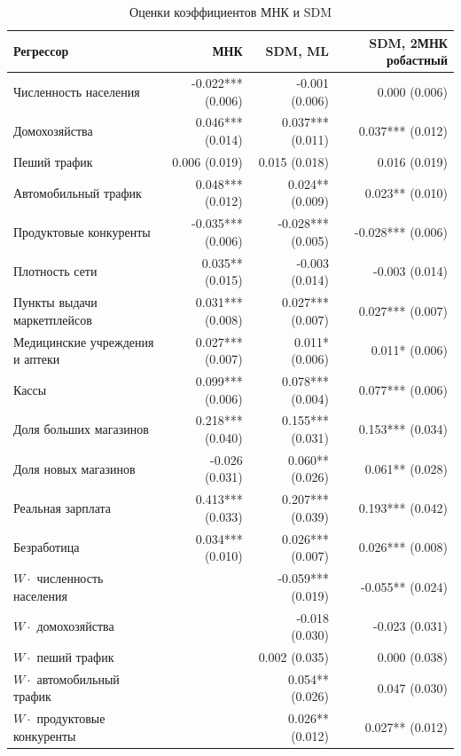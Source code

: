 \documentclass[12pt, a4paper]{article}
\begin{document}
\begin{table}[H]
    \centering
    \footnotesize
    \caption{Оценки коэффициентов МНК и SDM}
    \label{tab:sdm}
    \begin{tabular}{lrrr}
        \toprule
        \textbf{Регрессор} & \textbf{МНК} & \textbf{SDM, ML} & \textbf{SDM, 2МНК робастный} \\
        \midrule
        Численность населения & -0.022*** (0.006) & -0.001 (0.006) & 0.000 (0.006) \\
        Домохозяйства & 0.046*** (0.014) & 0.037*** (0.011) & 0.037*** (0.012) \\
        Пеший трафик & 0.006 (0.019) & 0.015 (0.018) & 0.016 (0.019) \\
        Автомобильный трафик & 0.048*** (0.012) & 0.024** (0.009) & 0.023** (0.010) \\
        Продуктовые конкуренты & -0.035*** (0.006) & -0.028*** (0.005) & -0.028*** (0.006) \\
        Плотность сети & 0.035** (0.015) & -0.003 (0.014) & -0.003 (0.014) \\
        Пункты выдачи маркетплейсов & 0.031*** (0.008) & 0.027*** (0.007) & 0.027*** (0.007) \\
        Медицинские учреждения и аптеки & 0.027*** (0.007) & 0.011* (0.006) & 0.011* (0.006) \\
        Кассы & 0.099*** (0.006) & 0.078*** (0.004) & 0.077*** (0.006) \\
        Доля больших магазинов & 0.218*** (0.040) & 0.155*** (0.031) & 0.153*** (0.034) \\
        Доля новых магазинов & -0.026 (0.031) & 0.060** (0.026) & 0.061** (0.028) \\
        Реальная зарплата & 0.413*** (0.033) & 0.207*** (0.039) & 0.193*** (0.042) \\
        Безработица & 0.034*** (0.010) & 0.026*** (0.007) & 0.026*** (0.008) \\
        $W \cdot$ численность населения &  & -0.059*** (0.019) & -0.055** (0.024) \\
        $W \cdot$ домохозяйства &  & -0.018 (0.030) & -0.023 (0.031) \\
        $W \cdot$ пеший трафик &  & 0.002 (0.035) & 0.000 (0.038) \\
        $W \cdot$ автомобильный трафик &  & 0.054** (0.026) & 0.047 (0.030) \\
        $W \cdot$ продуктовые конкуренты &  & 0.026** (0.012) & 0.027** (0.012) \\

\end{tabular}
\end{table}
\end{document}

